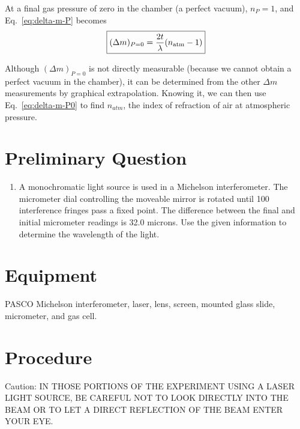 \documentclass{tufte-handout}
\begin{document}
At a final gas pressure of zero in the chamber (a perfect vacuum), 
$n_P = 1$, and Eq.~\ref{eq:delta-m-P} becomes
\begin{equation}
\boxed{ (\Delta m)_{P=0} = \frac{2t}{\lambda}(n_{\rm atm} - 1)}
\label{eq:delta-m-P0}
\end{equation}

Although $(\Delta m)_{P=0}$ is not directly measurable (because we cannot obtain
a perfect vacuum in the chamber), it can be determined from the other $\Delta m$
measurements by graphical extrapolation. Knowing it, we can then use
Eq.~\ref{eq:delta-m-P0} to find $n_{atm}$, the index of refraction of air at
atmospheric pressure.

\section{Preliminary Question}

\begin{enumerate}
\item A monochromatic light source is used in a Michelson interferometer.  The
  micrometer dial controlling the moveable mirror is rotated until 100
  interference fringes pass a fixed point. The difference between the final and
  initial micrometer readings is 32.0 microns. Use the given information to determine
  the wavelength of the light.
\end{enumerate}

\section{Equipment}
PASCO Michelson interferometer, laser, lens, screen, 
mounted glass slide, micrometer, and gas cell.

\section{Procedure}

Caution: IN THOSE PORTIONS OF THE EXPERIMENT USING A LASER LIGHT 
SOURCE, BE CAREFUL NOT TO LOOK DIRECTLY INTO THE BEAM OR TO LET 
A DIRECT REFLECTION OF THE BEAM ENTER YOUR EYE.
\end{document}

